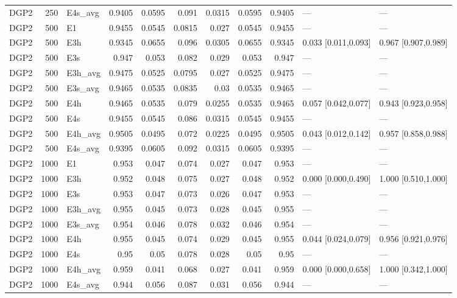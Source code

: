 \begin{table}[!htbp]
{\begin{tabular}{lrlrrrrrrll}
DGP2 & 250 & E4s_avg & 0.9405 & 0.0595 & 0.091 & 0.0315 & 0.0595 & 0.9405 & --- & --- \\
DGP2 & 500 & E1 & 0.9455 & 0.0545 & 0.0815 & 0.027 & 0.0545 & 0.9455 & --- & --- \\
DGP2 & 500 & E3h & 0.9345 & 0.0655 & 0.096 & 0.0305 & 0.0655 & 0.9345 & 0.033 [0.011,0.093] & 0.967 [0.907,0.989] \\
DGP2 & 500 & E3s & 0.947 & 0.053 & 0.082 & 0.029 & 0.053 & 0.947 & --- & --- \\
DGP2 & 500 & E3h_avg & 0.9475 & 0.0525 & 0.0795 & 0.027 & 0.0525 & 0.9475 & --- & --- \\
DGP2 & 500 & E3s_avg & 0.9465 & 0.0535 & 0.0835 & 0.03 & 0.0535 & 0.9465 & --- & --- \\
DGP2 & 500 & E4h & 0.9465 & 0.0535 & 0.079 & 0.0255 & 0.0535 & 0.9465 & 0.057 [0.042,0.077] & 0.943 [0.923,0.958] \\
DGP2 & 500 & E4s & 0.9455 & 0.0545 & 0.086 & 0.0315 & 0.0545 & 0.9455 & --- & --- \\
DGP2 & 500 & E4h_avg & 0.9505 & 0.0495 & 0.072 & 0.0225 & 0.0495 & 0.9505 & 0.043 [0.012,0.142] & 0.957 [0.858,0.988] \\
DGP2 & 500 & E4s_avg & 0.9395 & 0.0605 & 0.092 & 0.0315 & 0.0605 & 0.9395 & --- & --- \\
DGP2 & 1000 & E1 & 0.953 & 0.047 & 0.074 & 0.027 & 0.047 & 0.953 & --- & --- \\
DGP2 & 1000 & E3h & 0.952 & 0.048 & 0.075 & 0.027 & 0.048 & 0.952 & 0.000 [0.000,0.490] & 1.000 [0.510,1.000] \\
DGP2 & 1000 & E3s & 0.953 & 0.047 & 0.073 & 0.026 & 0.047 & 0.953 & --- & --- \\
DGP2 & 1000 & E3h_avg & 0.955 & 0.045 & 0.073 & 0.028 & 0.045 & 0.955 & --- & --- \\
DGP2 & 1000 & E3s_avg & 0.954 & 0.046 & 0.078 & 0.032 & 0.046 & 0.954 & --- & --- \\
DGP2 & 1000 & E4h & 0.955 & 0.045 & 0.074 & 0.029 & 0.045 & 0.955 & 0.044 [0.024,0.079] & 0.956 [0.921,0.976] \\
DGP2 & 1000 & E4s & 0.95 & 0.05 & 0.078 & 0.028 & 0.05 & 0.95 & --- & --- \\
DGP2 & 1000 & E4h_avg & 0.959 & 0.041 & 0.068 & 0.027 & 0.041 & 0.959 & 0.000 [0.000,0.658] & 1.000 [0.342,1.000] \\
DGP2 & 1000 & E4s_avg & 0.944 & 0.056 & 0.087 & 0.031 & 0.056 & 0.944 & --- & --- \\
\bottomrule
\end{tabular}
}
\end{table}
